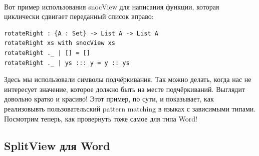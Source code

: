 \documentclass[8pt]{extarticle}
\begin{document}
\\
Вот пример использования snocView для написания функции, которая циклически сдвигает переданный список вправо:
\begin{lstlisting}
rotateRight : {A : Set} -> List A -> List A
rotateRight xs with snocView xs
rotateRight ._ | [] = []
rotateRight ._ | ys ::: y = y :: ys
\end{lstlisting}
Здесь мы использовали символы подчёркивания. Так можно делать, когда нас не интересует значение, которое должно быть на месте подчёркиваний. Выглядит довольно кратко и красиво! Этот пример, по сути, и показывает, как реализовывть пользовательский pattern matching в языках с зависимыми типами. Посмотрим теперь, как провернуть тоже самое для типа Word!


\subsection{SplitView для Word}
\end{document}

